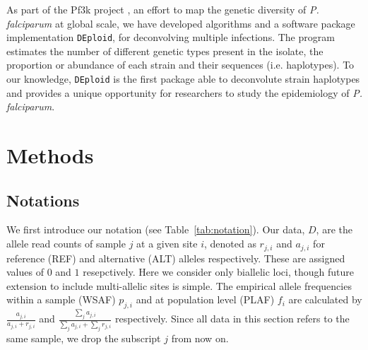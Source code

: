 \documentclass{bioinfo}
\begin{document}
As part of the Pf3k project \citep{Pf3k2016}, an effort to map the genetic diversity of {\it P. falciparum} at global scale, we have developed algorithms and a software package implementation \texttt{DEploid}, for deconvolving multiple infections. The program estimates the number of different genetic types present in the isolate, the proportion or abundance of each strain and their sequences (i.e. haplotypes). To our knowledge, \texttt{DEploid} is the first package able to deconvolute strain haplotypes and provides a unique opportunity for researchers to study the epidemiology of {\it P. falciparum}.


\section{Methods}

\subsection{Notations}

We first introduce our notation (see Table~\ref{tab:notation}). Our data, $D$, are the allele read counts of sample $j$ at a given site $i$, denoted as $r_{j,i}$ and $a_{j,i}$ for reference (REF) and alternative (ALT) alleles respectively.  These are assigned values of $0$ and $1$ resepctively. Here we consider only biallelic loci, though future extension to include multi-allelic sites is simple.  The empirical allele frequencies within a sample (WSAF) $p_{j,i}$ and at population level (PLAF) $f_i$ are calculated by $ \frac{a_{j,i}}{a_{j,i} + r_{j,i}}$ and $ \frac{\sum_j a_{j,i}}{\sum_j a_{j,i} + \sum_j r_{j,i}}$ respectively. Since all data in this section refers to the same sample, we drop the subscript $j$ from now on.
\end{document}

